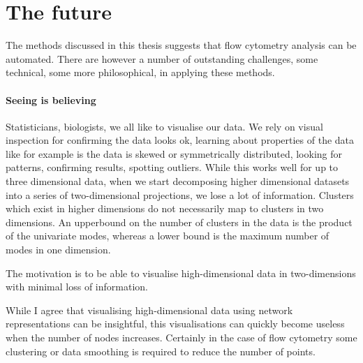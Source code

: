 
\section{ The future }

The methods discussed in this thesis suggests that flow cytometry analysis can be automated.
There are however a number of outstanding challenges, some technical, some more philosophical, in applying these methods.

\paragraph{Seeing is believing}

Statisticians, biologists, we all like to visualise our data.
We rely on visual inspection for confirming the data looks ok, learning about properties of the data like for example is the data
is skewed or symmetrically distributed, looking for patterns, confirming results, spotting outliers.
While this works well for up to three dimensional data, when we start decomposing higher dimensional datasets into
a series of two-dimensional projections, we lose a lot of information.
Clusters which exist in higher dimensions do not necessarily map to clusters in two dimensions.
An upperbound on the number of clusters in the data is the product of the univariate modes,
whereas a lower bound is the maximum number of modes in one dimension.

The motivation is to be able to visualise high-dimensional data in two-dimensions with minimal loss of information.

While I agree that visualising high-dimensional data using network representations can be insightful, this visualisations can quickly become
useless when the number of nodes increases.
Certainly in the case of flow cytometry some clustering or data smoothing is required to reduce the number of points.




